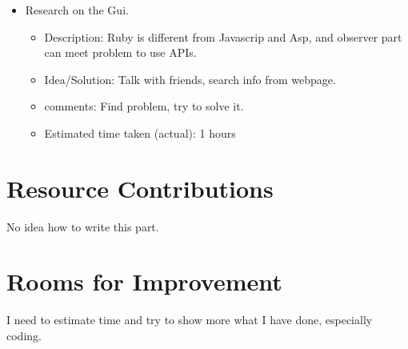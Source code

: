\begin{itemize}
	\item Research on the Gui. 
	      \begin{itemize}
	         \item Description: Ruby is different from Javascrip and Asp, and observer part can meet problem to use APIs.
	         \item Idea/Solution: Talk with friends, search info from webpage.
	         \item comments: Find problem, try to solve it.
	         \item Estimated time taken (actual): 1 hours
	     \end{itemize}
\end{itemize}

\section*{Resource Contributions}

No idea how to write this part.

\section*{Rooms for Improvement}

I need to estimate time and try to show more what I have done, especially coding.
